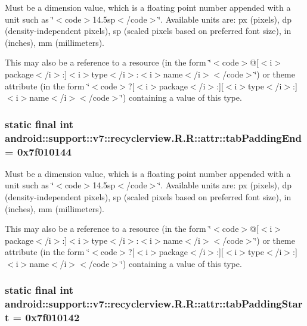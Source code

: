 Must be a dimension value, which is a floating point number appended with a unit such as \char`\"{}$<$code$>$14.5sp$<$/code$>$\char`\"{}. Available units are: px (pixels), dp (density-independent pixels), sp (scaled pixels based on preferred font size), in (inches), mm (millimeters). 

This may also be a reference to a resource (in the form \char`\"{}$<$code$>$@\mbox{[}$<$i$>$package$<$/i$>$:\mbox{]}$<$i$>$type$<$/i$>$:$<$i$>$name$<$/i$>$$<$/code$>$\char`\"{}) or theme attribute (in the form \char`\"{}$<$code$>$?\mbox{[}$<$i$>$package$<$/i$>$:\mbox{]}\mbox{[}$<$i$>$type$<$/i$>$:\mbox{]}$<$i$>$name$<$/i$>$$<$/code$>$\char`\"{}) containing a value of this type. \hypertarget{classandroid_1_1support_1_1v7_1_1recyclerview_1_1_r_1_1attr_b9f7e91cb55d827ed63f53ffe19a7468}{
\subsubsection[{tabPaddingEnd}]{\setlength{\rightskip}{0pt plus 5cm}static final int android::support::v7::recyclerview.R.R::attr::tabPaddingEnd = 0x7f010144}}
\label{classandroid_1_1support_1_1v7_1_1recyclerview_1_1_r_1_1attr_b9f7e91cb55d827ed63f53ffe19a7468}


Must be a dimension value, which is a floating point number appended with a unit such as \char`\"{}$<$code$>$14.5sp$<$/code$>$\char`\"{}. Available units are: px (pixels), dp (density-independent pixels), sp (scaled pixels based on preferred font size), in (inches), mm (millimeters). 

This may also be a reference to a resource (in the form \char`\"{}$<$code$>$@\mbox{[}$<$i$>$package$<$/i$>$:\mbox{]}$<$i$>$type$<$/i$>$:$<$i$>$name$<$/i$>$$<$/code$>$\char`\"{}) or theme attribute (in the form \char`\"{}$<$code$>$?\mbox{[}$<$i$>$package$<$/i$>$:\mbox{]}\mbox{[}$<$i$>$type$<$/i$>$:\mbox{]}$<$i$>$name$<$/i$>$$<$/code$>$\char`\"{}) containing a value of this type. \hypertarget{classandroid_1_1support_1_1v7_1_1recyclerview_1_1_r_1_1attr_93a5cdc83bf9b2cd42d2445d28c97c6b}{
\subsubsection[{tabPaddingStart}]{\setlength{\rightskip}{0pt plus 5cm}static final int android::support::v7::recyclerview.R.R::attr::tabPaddingStart = 0x7f010142}}
\label{classandroid_1_1support_1_1v7_1_1recyclerview_1_1_r_1_1attr_93a5cdc83bf9b2cd42d2445d28c97c6b}


